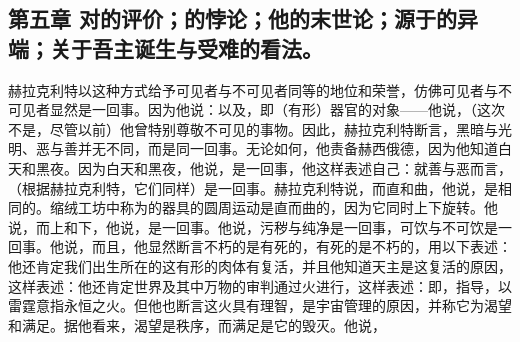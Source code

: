 
\subsection{第五章 对的评价；的悖论；他的末世论；源于的异端；关于吾主诞生与受难的看法。}

赫拉克利特以这种方式给予可见者与不可见者同等的地位和荣誉，仿佛可见者与不可见者显然是一回事。因为他说：以及，即（有形）器官的对象——他说，（这次不是，尽管以前）他曾特别尊敬不可见的事物。因此，赫拉克利特断言，黑暗与光明、恶与善并无不同，而是同一回事。无论如何，他责备赫西俄德，因为他知道白天和黑夜。因为白天和黑夜，他说，是一回事，他这样表述自己：就善与恶而言，（根据赫拉克利特，它们同样）是一回事。赫拉克利特说，而直和曲，他说，是相同的。缩绒工坊中称为的器具的圆周运动是直而曲的，因为它同时上下旋转。他说，而上和下，他说，是一回事。他说，污秽与纯净是一回事，可饮与不可饮是一回事。他说，而且，他显然断言不朽的是有死的，有死的是不朽的，用以下表述：他还肯定我们出生所在的这有形的肉体有复活，并且他知道天主是这复活的原因，这样表述：他还肯定世界及其中万物的审判通过火进行，这样表述：即，指导，以雷霆意指永恒之火。但他也断言这火具有理智，是宇宙管理的原因，并称它为渴望和满足。据他看来，渴望是秩序，而满足是它的毁灭。他说，\par


